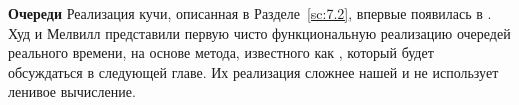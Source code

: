 \noindent
\textbf{Очереди}
Реализация кучи, описанная в Разделе~\ref{sc:7.2}, впервые появилась в
\cite{Okasaki1995c}. Худ и Мелвилл \cite{HoodMelville1981} представили
первую чисто функциональную реализацию очередей реального времени,
на основе метода, известного как  \cite{Overmars1983}, который будет
обсуждаться в следующей главе. Их реализация сложнее нашей и не использует ленивое
вычисление.

